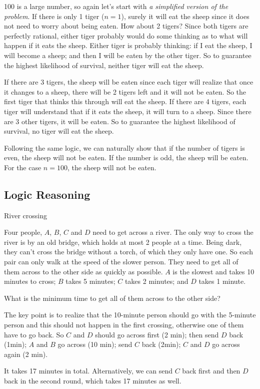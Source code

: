 \begin{solution}
100 is a large number, so again let's start with \emph{a simplified version of the problem}.
If there is only 1 tiger ($n=1$), surely it will eat the sheep since it does not need to worry
about being eaten. How about 2 tigers? Since both tigers are perfectly rational, either tiger
probably would do some thinking as to what will happen if it eats the sheep. Either tiger is
probably thinking: if I eat the sheep, I will become a sheep; and then I will be eaten by the
other tiger. So to guarantee the highest likelihood of survival, neither tiger will eat the
sheep.

If there are 3 tigers, the sheep will be eaten since each tiger will realize that once it
changes to a sheep, there will be 2 tigers left and it will not be eaten. So the first tiger that
thinks this through will eat the sheep. If there are 4 tigers, each tiger will understand
that if it eats the sheep, it will turn to a sheep. Since there are 3 other tigers, it will be
eaten. So to guarantee the highest likelihood of survival, no tiger will eat the sheep.

Following the same logic, we can naturally show that if the number of tigers is even, the
sheep will not be eaten. If the number is odd, the sheep will be eaten. For the case
$n=100$, the sheep will not be eaten.
\end{solution}

\subsection{Logic Reasoning}

\begin{problem}{River crossing}

Four people, $A$, $B$, $C$ and $D$ need to get across a river. The only way to cross the
river is by an old bridge, which holds at most 2 people at a time. Being dark, they can't
cross the bridge without a torch, of which they only have one. So each pair can only walk at
the speed of the slower person. They need to get all of them across to the other side as
quickly as possible. $A$ is the slowest and takes 10 minutes to cross; $B$ takes 5 minutes;
$C$ takes 2 minutes; and $D$ takes 1 minute.

What is the minimum time to get all of them across to the other side?\footnotemark[1]
\end{problem}

\begin{solution}
The key point is to realize that the 10-minute person should go with the 5-minute person
and this should not happen in the first crossing, otherwise one of them have to go back. So
$C$ and $D$ should go across first (2 min); then send $D$ back (1min); $A$ and $B$ go
across (10 min); send $C$ back (2min); $C$ and $D$ go across again (2 min).

It takes 17 minutes in total. Alternatively, we can send $C$ back first and then $D$ back in
the second round, which takes 17 minutes as well.

\end{solution}

